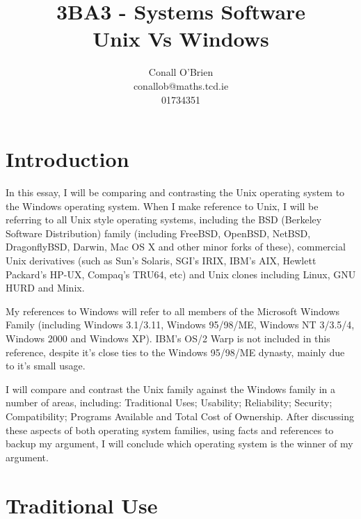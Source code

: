 \documentclass[a4paper,12pt]{article}
\begin{document}
\title{3BA3 - Systems Software \\ Unix Vs Windows \\ \vspace{20mm}}

\author{Conall O'Brien \\ conallob@maths.tcd.ie \\ 01734351 \\
\vspace{20mm}}

\maketitle

\newpage

\section*{Introduction}

In this essay, I will be comparing and contrasting the Unix operating
system to the Windows operating system. When I make reference to Unix, I
will be referring to all Unix style operating systems, including the BSD
(Berkeley Software Distribution) family (including FreeBSD, OpenBSD,
NetBSD, DragonflyBSD, Darwin, Mac OS X and other minor forks of
these), commercial Unix derivatives (such as Sun's Solaris, SGI's IRIX,
IBM's AIX, Hewlett Packard's HP-UX, Compaq's TRU64, etc) and Unix
clones including Linux, GNU HURD and Minix.

My references to Windows will refer to all members of the Microsoft
Windows Family (including Windows 3.1/3.11, Windows 95/98/ME, Windows NT 
3/3.5/4, Windows 2000 and Windows XP). IBM's OS/2 Warp is not included
in this reference, despite it's close ties to the Windows 95/98/ME
dynasty, mainly due to it's small usage.

I will compare and contrast the Unix family against the Windows family
in a number of areas, including: Traditional Uses; Usability;
Reliability; Security; Compatibility; Programs Available and Total Cost of
Ownership. After discussing these aspects of both operating system 
families, using facts and references to backup my argument, I will
conclude which operating system is the winner of my argument.

\section*{Traditional Use}
\end{document}
